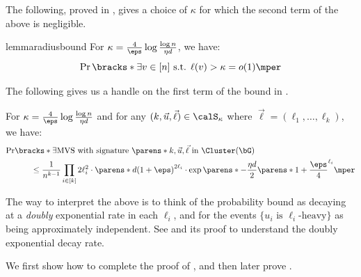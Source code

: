 \documentclass[11pt,letterpaper]{article}
\begin{document}
    The following, proved in , gives a choice of $\kappa$ for which the second term of the above is negligible.
    \begin{restatable}{lemma}{radiusbound} \label{lem:radius-bound}
        For $\kappa = \frac{4}{\eps}\log\frac{\log n}{\eta d}$, we have:
        \[
            \Pr\bracks*{\exists v\in[n]\text{ s.t. }\ell(v)>\kappa} = o(1)\mper
        \]
    \end{restatable}
    The following gives us a handle on the first term of the bound in .
    \begin{lemma}   \label{lem:single-signature-bound}
        For $\kappa = \frac{4}{\eps}\log\frac{\log n}{\eta d}$ and for any $(k,\vec{u},\vec{\ell})\in\calS_{\kappa}$ where $\vec{\ell} = (\ell_1,\dots,\ell_k)$, we have:
        \begin{align*}
            \Pr&\bracks*{\exists\text{MVS with signature }\parens*{k,\vec{u},\vec{\ell}} \text{ in }\Cluster(\bG) } \\
            &\qquad\le \frac{1}{n^{k-1}}\prod_{i\in[k]} 2\ell_i^2\cdot\parens*{d(1+\eps)}^{2\ell_i}\cdot\exp\parens*{-\frac{\eta d}{2}\parens*{1+\frac{\eps}{4}}^{\ell_i}}\mper
        \end{align*}
    \end{lemma}
    \begin{remark}
        The way to interpret the above is to think of the probability bound as decaying at a \emph{doubly} exponential rate in each $\ell_i$, and for the events $\{u_i\text{ is }\ell_i\text{-heavy}\}$ as being approximately independent.
        See  and its proof to understand the doubly exponential decay rate.
    \end{remark}
    We first show how to complete the proof of , and then later prove .
\end{document}
